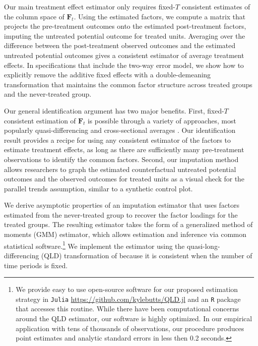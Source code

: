 \documentclass[12pt]{article}
\begin{document}
Our main treatment effect estimator only requires fixed-$T$ consistent estimates of the column space of $\bm{F}_t$. Using the estimated factors, we compute a matrix that projects the pre-treatment outcomes onto the estimated post-treatment factors, imputing the untreated potential outcome for treated units. Averaging over the difference between the post-treatment observed outcomes and the estimated untreated potential outcomes gives a consistent estimator of average treatment effects. In specifications that include the two-way error model, we show how to explicitly remove the additive fixed effects with a double-demeaning transformation that maintains the common factor structure across treated groups and the never-treated group.

Our general identification argument has two major benefits. First, fixed-$T$ consistent estimation of $\bm{F}_t$ is possible through a variety of approaches, most popularly quasi-differencing \citep{Ahn_Lee_Schmidt_2001,Ahn_Lee_Schmidt_2013,Callaway_Karami_2020} and cross-sectional averages \citep{Westerlund_Petrova_Norkute_2019,Juodis_Sarafidis_2022,Juodis_Sarafidis2021,Brown_Schmidt_Wooldridge2021}. Our identification result provides a recipe for using any consistent estimator of the factors to estimate treatment effects, as long as there are sufficiently many pre-treatment observations to identify the common factors. Second, our imputation method allows researchers to graph the estimated counterfactual untreated potential outcomes and the observed outcomes for treated units as a visual check for the parallel trends assumption, similar to a synthetic control plot.

We derive asymptotic properties of an imputation estimator that uses factors estimated from the never-treated group to recover the factor loadings for the treated groups. 
The resulting estimator takes the form of a generalized method of moments (GMM) estimator, which allows estimation and inference via common statistical software.\footnote{We provide easy to use open-source software for our proposed estimation strategy in \texttt{Julia} \url{https://github.com/kylebutts/QLD.jl} and an \texttt{R} package that accesses this routine. While there have been computational concerns around the QLD estimator, our software is highly optimized. In our empirical application with tens of thousands of observations, our procedure produces point estimates and analytic standard errors in less then 0.2 seconds.}
We implement the estimator using the quasi-long-differencing (QLD) transformation of \citet{Ahn_Lee_Schmidt_2013} because it is consistent when the number of time periods is fixed. 
\end{document}
